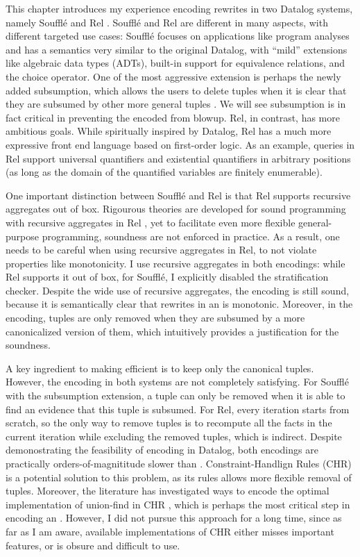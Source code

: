 This chapter introduces my experience encoding \egraph rewrites 
 in two Datalog systems, namely Souffl\'e \citep{souffle} and Rel \citep{rel-doc}.
Souffl\'e and Rel are different in many aspects, with different targeted use cases:
 Souffl\'e focuses on applications like program analyses
 and has a semantics very similar to the original Datalog,
 with ``mild'' extensions like algebraic data types (ADTs),
 built-in support for equivalence relations, and the choice operator.
One of the most aggressive extension is perhaps
 the newly added subsumption,
 which allows the users to delete tuples 
 when it is clear that they are subsumed by other more general tuples \citep{datalog-subsumption}.
We will see subsumption is in fact critical in preventing the encoded \egraphs from blowup.
Rel, in contrast, has more ambitious goals.
While spiritually inspired by Datalog, 
 Rel has a much more expressive front end language based on first-order logic.
As an example, 
 queries in Rel support universal quantifiers and existential quantifiers in arbitrary positions
 (as long as the domain of the quantified variables are finitely enumerable).

One important distinction between Souffl\'e and Rel is
 that Rel supports recursive aggregates out of box.
Rigourous theories are developed 
 for sound programming with recursive aggregates in Rel \citep{datalogo-convergence},
 yet to facilitate even more flexible general-purpose programming,
 soundness are not enforced in practice.
As a result,
 one needs to be careful when using recursive aggregates in Rel,
 to not violate properties like monotonicity.
I use recursive aggregates in both encodings:
 while Rel supports it out of box, 
 for Souffl\'e, I explicitly disabled the stratification checker.
Despite the wide use of recursive aggregates, the encoding is still sound,
 because it is semantically clear that rewrites in an \egraph is monotonic.
Moreover, in the encoding,
 tuples are only removed when they are subsumed by a more canonicalized version of them,
 which intuitively provides a justification for the soundness.

A key ingredient to making \egraph efficient is 
 to keep only the canonical tuples.
However, the encoding in both systems are not completely satisfying.
For Souffl\'e with the subsumption extension,
 a tuple can only be removed when it is able to find an evidence 
 that this tuple is subsumed.
For Rel, every iteration starts from scratch,
 so the only way to remove tuples is 
 to recompute all the facts in the current iteration while excluding the removed tuples,
 which is indirect.
Despite demonostrating the feasibility of encoding \egraphs in Datalog, 
 both encodings are practically orders-of-magnititude slower than \egg.
Constraint-Handlign Rules (CHR) \citep{chr} is a potential solution to this problem,
 as its rules allows more flexible removal of tuples.
Moreover,
 the literature has investigated 
 ways to encode the optimal implementation of union-find in CHR \citep{uf-chr},
 which is perhaps the most critical step in encoding an \egraph.
However, I did not pursue this approach for a long time, 
 since as far as I am aware, available implementations of CHR either misses important features,
 or is obsure and difficult to use.

